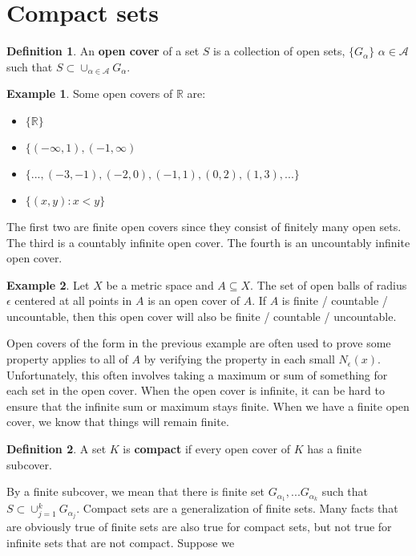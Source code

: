 \documentclass[12pt,reqno]{amsart}
\theoremstyle{definition}
\newtheorem{definition}{Definition}[section]
\newtheorem{example}{Example}[section]
\def\R{\mathbb{R}}
\begin{document}
\section{Compact sets}

\begin{definition}
  An \textbf{open cover} of a set $S$ is a collection of open sets,
  $\{G_\alpha\}$  $\alpha \in \mathcal{A}$ such that $S \subset
  \cup_{\alpha \in \mathcal{A}} G_\alpha$. 
\end{definition}
\begin{example}
  Some open covers of $\R$ are:
  \begin{itemize}
  \item $\{\R\}$ 
  \item $\{(-\infty, 1), (-1, \infty)$
  \item $\{..., (-3, -1), (-2, 0),(-1,1), (0,2), (1,3), ... \}$
  \item $\{(x,y) : x<y \}$
  \end{itemize}
  The first two are finite open covers since they consist of finitely
  many open sets. The third is a countably infinite open cover. The
  fourth is an uncountably infinite open cover. 
\end{example}
\begin{example}
  Let $X$ be a metric space and $A \subseteq X$. The set of open balls
  of radius $\epsilon$ centered at all points in $A$ is an open cover
  of $A$. If $A$ is finite / countable / uncountable, then this open
  cover will also be finite / countable / uncountable. 
\end{example}
Open covers of the form in the previous example are often used to
prove some property applies to all of $A$ by verifying the property in
each small $N_\epsilon(x)$. Unfortunately, this often involves taking
a maximum or sum of something for each set in the open cover. When the
open cover is infinite, it can be hard to ensure that the infinite sum
or maximum stays finite. When we have a finite open cover, we know
that things will remain finite. 
\begin{definition}
  A set $K$ is \textbf{compact} if every open cover of $K$ has a
  finite subcover. 
\end{definition}
By a finite subcover, we mean that there is finite set $G_{\alpha_1},
... G_{\alpha_k}$ such that $S \subset \cup_{j=1}^k
G_{\alpha_j}$. Compact sets are a generalization of finite sets. Many
facts that are obviously true of finite sets are also true for compact
sets, but not true for infinite sets that are not compact. Suppose we
\end{document}
